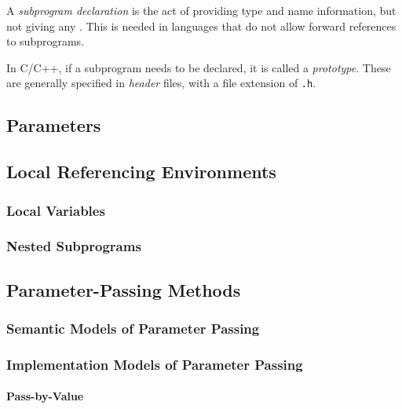 \begin{definition}\label{def:Subprogram_Declaration}
  A \emph{subprogram declaration} is the act of providing type and name information, but not giving any .
  This is needed in languages that do not allow forward references to subprograms.

  \begin{remark}[Prototype]\label{rmk:Subprogram_Prototype}
    In C/C++, if a subprogram needs to be declared, it is called a \emph{prototype}.
    These are generally specified in \emph{header} files, with a file extension of \texttt{.h}.
  \end{remark}
\end{definition}

\subsection{Parameters}\label{subsec:Subprogram_Parameters}
\subsection{Local Referencing Environments}\label{subsec:Local_Referencing_Environments}
\subsubsection{Local Variables}\label{subsubsec:Local_Variables}
\subsubsection{Nested Subprograms}\label{subsubsec:Nested_Subprograms}

\subsection{Parameter-Passing Methods}\label{subsec:Parameter_Passing_Methods}
\subsubsection{Semantic Models of Parameter Passing}\label{subsubsec:Semantic_Models_Parameter_Passing}
\subsubsection{Implementation Models of Parameter Passing}\label{subsubsec:Implementation_Models_Parameter_Passing}
\paragraph{Pass-by-Value}\label{par:Parameter_Passing-Pass_By_Value}
